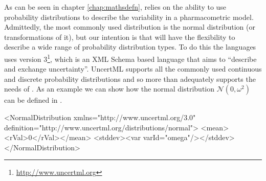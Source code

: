 As can be seen in chapter \ref{chap:mathsdefn}, \pharmml relies on the
ability to use probability distributions to describe the variability
in a pharmacometric model. Admittedly, the most commonly used
distribution is the normal distribution (or transformations of it),
but our intention is that \pharmml will have the flexibility to
describe a wide range of probability distribution types. To do this
the languages uses \uncertml version
3\footnote{\url{http://www.uncertml.org}}, which is an XML Schema
based language that aims to ``describe and exchange
uncertainty''. UncertML supports all the commonly used continuous and
discrete probability distributions and so more than adequately
supports the needs of \pharmml.  As an example we can show how the
normal distribution $\mathcal{N}(0, \omega^2)$ can be defined in
\uncertml.
\begin{xmlcode}
<NormalDistribution xmlns="http://www.uncertml.org/3.0"
    definition="http://www.uncertml.org/distributions/normal">
    <mean><rVal>0</rVal></mean>
    <stddev><var varId="omega"/></stddev>
</NormalDistribution>
\end{xmlcode}






